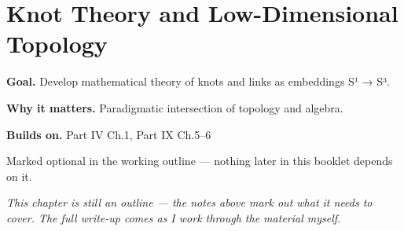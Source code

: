 \chapter{Knot Theory and Low-Dimensional Topology}
\label{ch:09-topology-08}

\begin{chapterintro}
\textbf{Goal.} Develop mathematical theory of knots and links as embeddings S¹ → S³.

\textbf{Why it matters.} Paradigmatic intersection of topology and algebra.

\textbf{Builds on.} Part IV Ch.1, Part IX Ch.5–6
\end{chapterintro}

\begin{remarkbox}
Marked optional in the working outline --- nothing later in this booklet depends on it.
\end{remarkbox}

\textit{This chapter is still an outline --- the notes above mark out what it needs to cover. The full write-up comes as I work through the material myself.}
